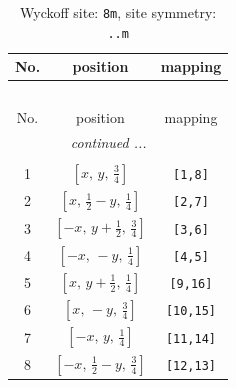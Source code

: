 \documentclass[fleqn,8pt]{jsarticle}
\begin{document}
\begin{longtable}{ccc}
\caption{Wyckoff site: {\tt 8m}, site symmetry: {\tt ..m}}
 \\
 \hline \hline
No. & position & mapping \\ \hline \endfirsthead

\multicolumn{2}{l}{\tablename\ \thetable{}} \\
 \hline \hline
No. & position & mapping \\ \hline \endhead

 \hline \hline
\multicolumn{2}{r}{\footnotesize\it continued ...} \\ \endfoot

 \hline \hline
\multicolumn{2}{r}{} \\ \endlastfoot

1 & $\left[ x,\, y,\, \frac{3}{4} \right]$ & {\tt [1,8]} \\ \hline
2 & $\left[ x,\, \frac{1}{2} - y,\, \frac{1}{4} \right]$ & {\tt [2,7]} \\ \hline
3 & $\left[ - x,\, y + \frac{1}{2},\, \frac{3}{4} \right]$ & {\tt [3,6]} \\ \hline
4 & $\left[ - x,\, - y,\, \frac{1}{4} \right]$ & {\tt [4,5]} \\ \hline
5 & $\left[ x,\, y + \frac{1}{2},\, \frac{1}{4} \right]$ & {\tt [9,16]} \\ \hline
6 & $\left[ x,\, - y,\, \frac{3}{4} \right]$ & {\tt [10,15]} \\ \hline
7 & $\left[ - x,\, y,\, \frac{1}{4} \right]$ & {\tt [11,14]} \\ \hline
8 & $\left[ - x,\, \frac{1}{2} - y,\, \frac{3}{4} \right]$ & {\tt [12,13]} \\
\end{longtable}
\renewcommand{\arraystretch}{1.2}
\end{document}
